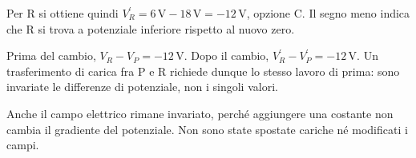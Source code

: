 \documentclass[11pt,a4paper]{article}
\begin{document}
\begin{samepage}
Per R si ottiene quindi \(V_R^{\prime}=6\,\mathrm V-18\,\mathrm V=-12\,\mathrm V\), opzione C. Il segno meno indica che R si trova a potenziale inferiore rispetto al nuovo zero.\par

Prima del cambio, \(V_R-V_P=-12\,\mathrm V\). Dopo il cambio, \(V_R^{\prime}-V_P^{\prime}=-12\,\mathrm V\). Un trasferimento di carica fra P e R richiede dunque lo stesso lavoro di prima: sono invariate le differenze di potenziale, non i singoli valori.\par

Anche il campo elettrico rimane invariato, perché aggiungere una costante non cambia il gradiente del potenziale. Non sono state spostate cariche né modificati i campi.\par

\end{samepage}
\newpage
\end{document}
